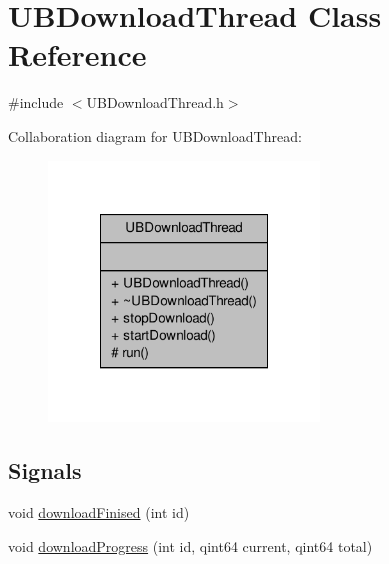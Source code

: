\hypertarget{class_u_b_download_thread}{\section{U\-B\-Download\-Thread Class Reference}
\label{d4/dd6/class_u_b_download_thread}
}


{\ttfamily \#include $<$U\-B\-Download\-Thread.\-h$>$}



Collaboration diagram for U\-B\-Download\-Thread\-:
\nopagebreak
\begin{figure}[H]
\begin{center}
\leavevmode
\includegraphics[width=204pt]{db/d8f/class_u_b_download_thread__coll__graph}
\end{center}
\end{figure}
\subsection*{Signals}
\begin{DoxyCompactItemize}
\item 
void \hyperlink{class_u_b_download_thread_a4e2f2991dae89e09ff198474752d1707}{download\-Finised} (int id)
\item 
void \hyperlink{class_u_b_download_thread_a4e8be31b6a91295c822016310ba06fc6}{download\-Progress} (int id, qint64 current, qint64 total)
\end{DoxyCompactItemize}
